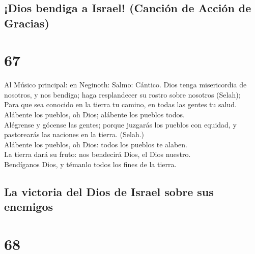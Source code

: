 \hypertarget{dios-bendiga-a-israel-canciuxf3n-de-acciuxf3n-de-gracias}{%
\subsection{¡Dios bendiga a Israel! (Canción de Acción de
Gracias)}\label{dios-bendiga-a-israel-canciuxf3n-de-acciuxf3n-de-gracias}}

\hypertarget{section-66}{%
\section{67}\label{section-66}}

 Al Músico principal: en Neginoth: Salmo: Cántico. Dios
tenga misericordia de nosotros, y nos bendiga; haga resplandecer su
rostro sobre nosotros (Selah);\\
 Para que sea conocido en la tierra tu camino, en todas
las gentes tu salud.\\
 Alábente los pueblos, oh Dios; alábente los pueblos
todos.\\
 Alégrense y gócense las gentes; porque juzgarás los
pueblos con equidad, y pastorearás las naciones en la tierra. (Selah.)\\
 Alábente los pueblos, oh Dios: todos los pueblos te
alaben.\\
 La tierra dará su fruto: nos bendecirá Dios, el Dios
nuestro.\\
 Bendíganos Dios, y témanlo todos los fines de la tierra.

\hypertarget{la-victoria-del-dios-de-israel-sobre-sus-enemigos}{%
\subsection{La victoria del Dios de Israel sobre sus
enemigos}\label{la-victoria-del-dios-de-israel-sobre-sus-enemigos}}

\hypertarget{section-67}{%
\section{68}\label{section-67}}

